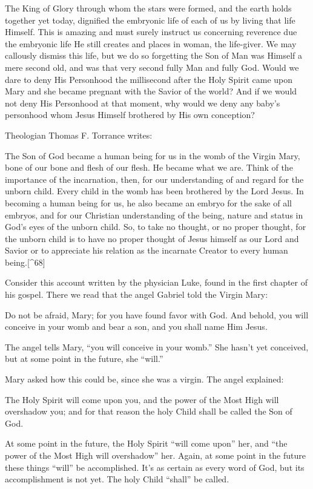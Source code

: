 \documentclass[
]{book}
\begin{document}
The King of Glory through whom the stars were formed, and the earth holds together yet today, dignified the embryonic life of each of us by living that life Himself. This is amazing and must surely instruct us concerning reverence due the embryonic life He still creates and places in woman, the life-giver. We may callously dismiss this life, but we do so forgetting the Son of Man was Himself a mere second old, and was that very second fully Man and fully God. Would we dare to deny His Personhood the millisecond after the Holy Spirit came upon Mary and she became pregnant with the Savior of the world? And if we would not deny His Personhood at that moment, why would we deny any baby's personhood whom Jesus Himself brothered by His own conception?

Theologian Thomas F. Torrance writes:

The Son of God became a human being for us in the womb of the Virgin Mary, bone of our bone and flesh of our flesh. He became what we are. Think of the importance of the incarnation, then, for our understanding of and regard for the unborn child. Every child in the womb has been brothered by the Lord Jesus. In becoming a human being for us, he also became an embryo for the sake of all embryos, and for our Christian understanding of the being, nature and status in God's eyes of the unborn child. So, to take no thought, or no proper thought, for the unborn child is to have no proper thought of Jesus himself as our Lord and Savior or to appreciate his relation as the incarnate Creator to every human being.{[}\^{}68{]}

Consider this account written by the physician Luke, found in the first chapter of his gospel. There we read that the angel Gabriel told the Virgin Mary:

Do not be afraid, Mary; for you have found favor with God. And behold, you will conceive in your womb and bear a son, and you shall name Him Jesus.

The angel tells Mary, ``you will conceive in your womb.'' She hasn't yet conceived, but at some point in the future, she ``will.''

Mary asked how this could be, since she was a virgin. The angel explained:

The Holy Spirit will come upon you, and the power of the Most High will overshadow you; and for that reason the holy Child shall be called the Son of God.

At some point in the future, the Holy Spirit ``will come upon'' her, and ``the power of the Most High will overshadow'' her. Again, at some point in the future these things ``will'' be accomplished. It's as certain as every word of God, but its accomplishment is not yet. The holy Child ``shall'' be called.
\end{document}
